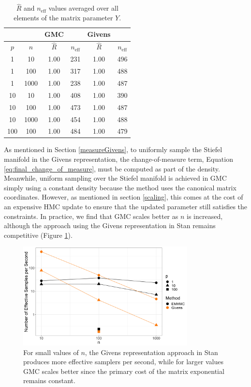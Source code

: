 \documentclass[ba]{imsart}
\numberwithin{equation}{section}
\theoremstyle{plain}
\begin{document}
\begin{table}
\begin{tabular}{|cc||cc|cc|}
\hline
& & GMC & & Givens &\\
\hline
$p$ & $n$  & $\hat{R}$ & $n_{\mathrm{eff}}$ & $\hat{R}$ & $n_{\mathrm{eff}}$\\
\hline
\hline
1 & 10 & 1.00 & 231 & 1.00 & 496\\
1 & 100 & 1.00 & 317 & 1.00 & 488\\
1 & 1000 & 1.00 & 238 & 1.00 & 487 \\
\hline
10 & 10 & 1.00 & 408 & 1.00  & 390\\
10 & 100 & 1.00 & 473 & 1.00 & 487\\
10 & 1000 & 1.00 & 454 & 1.00  & 488 \\
\hline
100 & 100 & 1.00 & 484 & 1.00 & 479 \\
\hline
\end{tabular}
\caption{$\hat{R}$ and $n_{\mathrm{eff}}$ values averaged over all elements of the matrix parameter $Y$. }
\label{tab:rhat_neff}
\end{table}

\noindent As mentioned in Section \ref{measureGivens}, to uniformly sample the Stiefel manifold in the Givens representation, the change-of-measure term, Equation \ref{eq:final_change_of_measure}, must be computed as part of the density. Meanwhile, uniform sampling over the Stiefel manifold is achieved in GMC simply using a constant density because the method uses the canonical matrix coordinates. However, as mentioned in section \ref{scaling}, this comes at the cost of an expensive HMC update to ensure that the updated parameter still satisfies the constraints. In practice, we find that GMC scales better as $n$ is increased, although the approach using the Givens representation in Stan remains competitive (Figure \ref{fig:scaling}).

\begin{figure}[h]
\centering
\vspace{.1in}
\includegraphics[width=0.8\textwidth]{figures/scaling.png}
\vspace{.05in}
\caption{For small values of $n$, the Givens representation approach in Stan produces more effective samplers per second, while for larger values GMC scales better since the primary cost of the matrix exponential remains constant.}
\label{fig:scaling}
\end{figure}
\end{document}
